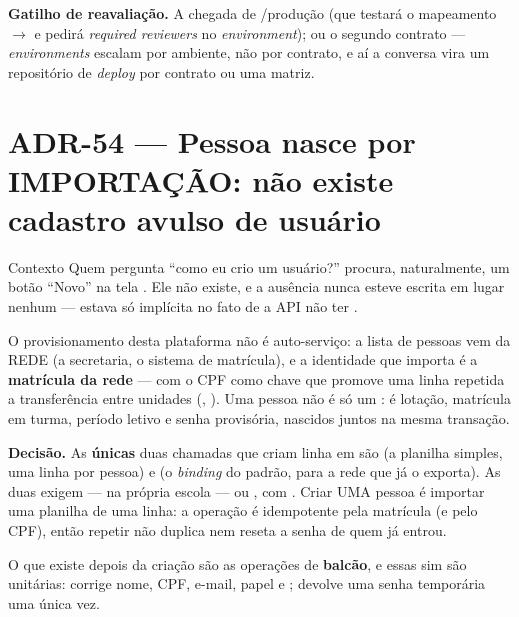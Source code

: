 \textbf{Gatilho de reavaliação.} A chegada de /produção (que testará o
mapeamento  \(\to\)  e pedirá \emph{required reviewers} no
\emph{environment}); ou o segundo contrato --- \emph{environments} escalam por
ambiente, não por contrato, e aí a conversa vira um repositório de
\emph{deploy} por contrato ou uma matriz.

\section{ADR-54 --- Pessoa nasce por IMPORTAÇÃO: não existe cadastro avulso de
usuário}
\label{adr:sem-cadastro-avulso}

\begin{especificacao}{Contexto}
Quem pergunta \enquote{como eu crio um usuário?} procura, naturalmente, um botão
\enquote{Novo} na tela . Ele não existe, e a ausência
nunca esteve escrita em lugar nenhum --- estava só implícita no fato de a API
não ter .

O provisionamento desta plataforma não é auto-serviço: a lista de pessoas vem da
REDE (a secretaria, o sistema de matrícula), e a identidade que importa é a
\textbf{matrícula da rede} --- com o CPF como chave que promove uma linha
repetida a transferência entre unidades (, ). Uma
pessoa não é só um : é lotação, matrícula em turma, período letivo e
senha provisória, nascidos juntos na mesma transação.
\end{especificacao}

\textbf{Decisão.} As \textbf{únicas} duas chamadas que criam linha em
 são  (a planilha simples, uma linha
por pessoa) e  (o \emph{binding} do
padrão, para a rede que já o exporta). As duas exigem  --- na própria
escola --- ou , com . Criar UMA pessoa é
importar uma planilha de uma linha: a operação é idempotente pela matrícula (e
pelo CPF), então repetir não duplica nem reseta a senha de quem já entrou.

O que existe depois da criação são as operações de \textbf{balcão}, e essas sim
são unitárias:  corrige nome, CPF, e-mail, papel e
;  devolve uma senha temporária
uma única vez.


